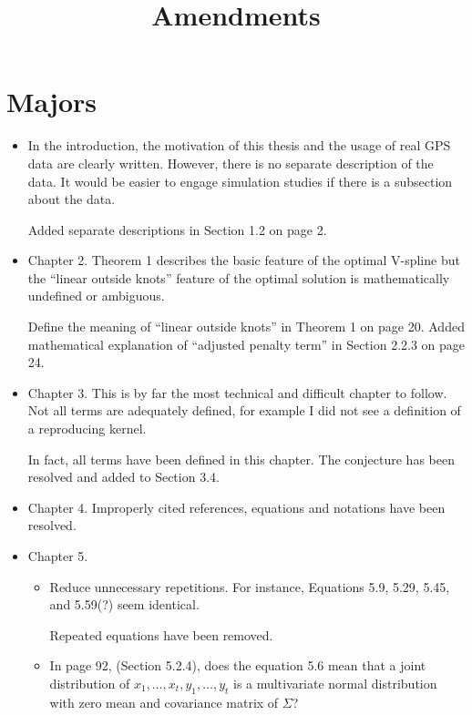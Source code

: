 \documentclass[a4paper,18pt]{extarticle}
\title{Amendments}
\date{}							%
\begin{document}
\maketitle


\section{Majors}

\begin{itemize}
	\item In the introduction, the motivation of this thesis and the usage of real GPS data are clearly written. However, there is no separate description of the data. It would be easier to engage simulation studies if there is a subsection about the data.
	
	Added separate descriptions in Section 1.2 on page 2.
	
	\item  Chapter 2. Theorem 1 describes the basic feature of the optimal V-spline but the ``linear outside knots'' feature of the optimal solution is mathematically undefined or ambiguous. 
	
	Define the meaning of ``linear outside knots'' in Theorem 1 on page 20.
	Added mathematical explanation of ``adjusted penalty term'' in Section 2.2.3 on page 24.
	
	\item  Chapter 3. This is by far the most technical and difficult chapter to follow. Not all terms are adequately defined, for example I did not see a definition of a reproducing kernel. 
	
	In fact, all terms have been defined in this chapter. The conjecture has been resolved and added to Section 3.4.
	
	\item  Chapter 4. Improperly cited references, equations and notations have been resolved. 
	
	\item  Chapter 5. 
	\begin{itemize}
		\item Reduce unnecessary repetitions. For instance, Equations 5.9, 5.29, 5.45, and 5.59(?) seem identical. 
		
		Repeated equations have been removed.  
		
		\item  In page 92, (Section 5.2.4), does the equation 5.6 mean that a joint distribution of $x_1,\ldots,x_t,y_1,\ldots,y_t$ is a multivariate normal distribution with zero mean and covariance matrix of $\Sigma$?
		

\end{itemize}
\end{itemize}
\end{document}
